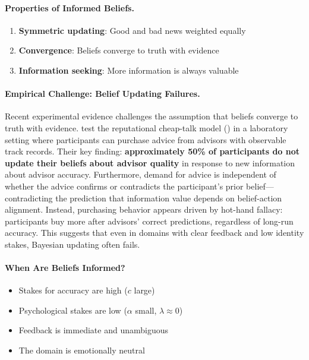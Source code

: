 \paragraph{Properties of Informed Beliefs.}
\begin{enumerate}
\item \textbf{Symmetric updating}: Good and bad news weighted equally
\item \textbf{Convergence}: Beliefs converge to truth with evidence
\item \textbf{Information seeking}: More information is always valuable
\end{enumerate}

\paragraph{Empirical Challenge: Belief Updating Failures.}
Recent experimental evidence challenges the assumption that beliefs converge to
truth with evidence. \citet{PAP-bregolin2026advice} test the reputational cheap-talk
model (\citealt{sobel1985theory}) in a laboratory setting where participants can
purchase advice from advisors with observable track records. Their key finding:
\textbf{approximately 50\% of participants do not update their beliefs about
advisor quality} in response to new information about advisor accuracy.
Furthermore, demand for advice is independent of whether the advice confirms or
contradicts the participant's prior belief---contradicting the prediction that
information value depends on belief-action alignment. Instead, purchasing behavior
appears driven by hot-hand fallacy: participants buy more after advisors' correct
predictions, regardless of long-run accuracy. This suggests that even in domains
with clear feedback and low identity stakes, Bayesian updating often fails.

\paragraph{When Are Beliefs Informed?}
\begin{itemize}
\item Stakes for accuracy are high ($c$ large)
\item Psychological stakes are low ($\alpha$ small, $\lambda \approx 0$)
\item Feedback is immediate and unambiguous
\item The domain is emotionally neutral
\end{itemize}

